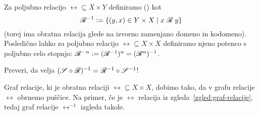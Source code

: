                 Za poljubno relacijo $\rel \subseteq X \times Y$ definiramo  ()  kot
                \[\rel^{-1} \dfeq \set{(y, x) \in Y \times X}{\rel[x][y]}\]
                (torej ima obratna relacija glede na izvorno zamenjano domeno in kodomeno). Posledično lahko za poljubno relacijo $\rel \subseteq X \times X$ definiramo njeno potenco s poljubno celo stopnjo: $\rel^{-n} \dfeq (\rel^{-1})^n = (\rel^n)^{-1}$.

                \begin{vaja}
                        Preveri, da velja $(\srel \circ \rel)^{-1} = \rel^{-1} \circ \srel^{-1}$!
                \end{vaja}

                \begin{zgled}
                        Graf relacije, ki je obratna relaciji $\rel \subseteq X \times X$, dobimo tako, da v grafu relacije $\rel$ obrnemo puščice. Na primer, če je $\rel$ relacija iz zgleda~\ref{zgled:graf-relacije}, tedaj graf relacije $\rel^{-1}$ izgleda takole.

                \end{zgled}

